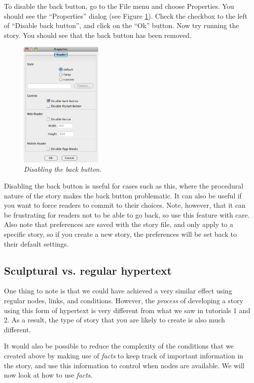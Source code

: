 \documentclass{article}
\begin{document}
To disable the back button, go to the File menu and choose Properties. You should
see the ``Properties'' dialog (see Figure \ref{fig:tut3:preferences}). Check the
checkbox to the left of ``Disable back button'', and click on the ``Ok'' button.
Now try running the story. You should see that the back button has been removed.

\begin{figure}[h]
  \centering
  \includegraphics[width=4cm]{images/hypedyn-tutorial-3-figure-8}
  \caption{\textit{Disabling the back button.}}
  \label{fig:tut3:preferences}
\end{figure} 

Disabling the back button is useful for cases such as this, where the procedural
nature of the story makes the back button problematic. It can also be useful if
you want to force readers to commit to their choices. Note, however, that it can
be frustrating for readers not to be able to go back, so use this feature with
care. Also note that preferences are saved with the story file, and only apply to
a specific story, so if you create a new story, the preferences will be set back
to their default settings.

\subsection{Sculptural vs. regular hypertext}

One thing to note is that we could have achieved a very similar effect using
regular nodes, links, and conditions. However, the \textit{process} of
developing a story using this form of hypertext is very different from what we
saw in tutorials 1 and 2. As a result, the type of story that you are likely to
create is also much different.

It would also be possible to reduce the complexity of the conditions that we
created above by making use of \textit{facts} to keep track of important
information in the story, and use this information to control when nodes are
available. We will now look at how to use \textit{facts}.
\end{document}
